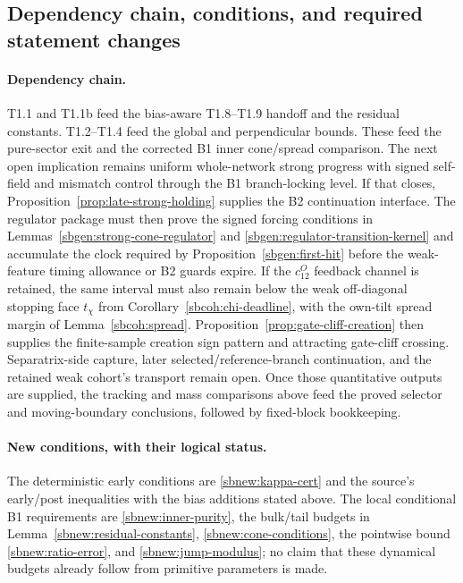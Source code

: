 \documentclass{article} %
\theoremstyle{plain}
\theoremstyle{definition}
\theoremstyle{remark}
\begin{document}
\subsection{Dependency chain, conditions, and required statement changes}
\paragraph{Dependency chain.}
T1.1 and T1.1b feed the bias-aware T1.8--T1.9 handoff and the residual
constants. T1.2--T1.4 feed the global and perpendicular bounds. These feed
the pure-sector exit and the corrected B1 inner cone/spread comparison.
The next open implication remains uniform whole-network strong progress with
signed self-field and mismatch control through the B1 branch-locking level.
If that closes, Proposition~\ref{prop:late-strong-holding} supplies the B2
continuation interface.  The regulator package must then prove the signed
forcing conditions in Lemmas~\ref{sbgen:strong-cone-regulator} and
\ref{sbgen:regulator-transition-kernel} and accumulate the clock required by
Proposition~\ref{sbgen:first-hit} before the weak-feature timing allowance or
B2 guards expire.  If the $c_{12}^O$ feedback channel is retained, the same
interval must also remain below the weak off-diagonal stopping face
$t_\chi$ from Corollary~\ref{sbcoh:chi-deadline}, with the own-tilt spread
margin of Lemma~\ref{sbcoh:spread}.  Proposition~\ref{prop:gate-cliff-creation} then supplies
the finite-sample creation sign pattern and attracting gate-cliff crossing. Separatrix-side
capture, later selected/reference-branch continuation, and the retained weak
cohort's transport remain open. Once those quantitative outputs are supplied,
the tracking and mass comparisons above feed the proved selector and
moving-boundary conclusions, followed by fixed-block bookkeeping.

\paragraph{New conditions, with their logical status.}
The deterministic early conditions are \eqref{sbnew:kappa-cert} and the
source's early/post inequalities with the bias additions stated above. The
local conditional B1 requirements are \eqref{sbnew:inner-purity}, the
bulk/tail budgets in Lemma~\ref{sbnew:residual-constants},
\eqref{sbnew:cone-conditions}, the pointwise bound
\eqref{sbnew:ratio-error}, and \eqref{sbnew:jump-modulus}; no claim that
these dynamical budgets already follow from primitive parameters is made.
\end{document}
